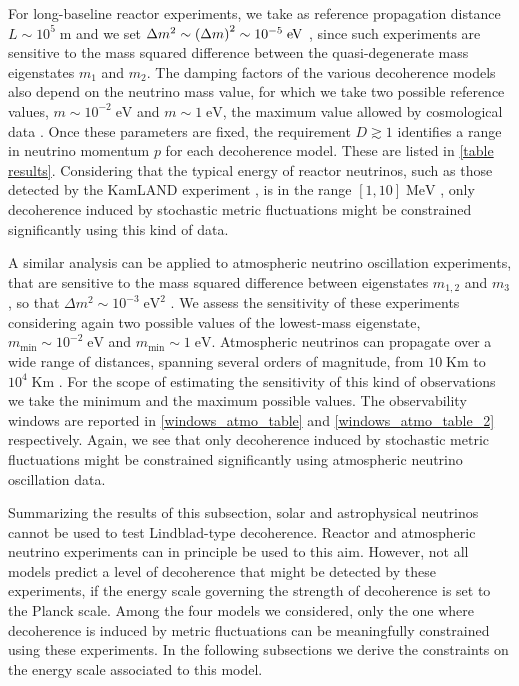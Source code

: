 \documentclass[11pt]{article}
\begin{document}
For long-baseline reactor experiments, we take as reference  propagation distance $L\sim 10^5\;\text{m}$ 
and we set $\Delta m^2 \sim \qty(\Delta m)^2 \sim 10^{-5} \;\text{eV}$ \cite{KamLAND:2008dgz}, since such experiments are sensitive to the mass squared difference between the quasi-degenerate mass eigenstates $m_1$ and $m_2$. The damping factors of the various decoherence models also depend on the neutrino mass value, for which we take two possible reference values, $m\sim 10^{-2}\;\text{eV}$ and $m \sim 1\;\text{eV}$, the maximum  value allowed by cosmological data \cite{DiValentino:2021imh}. Once these   parameters  are fixed, the requirement $D\gtrsim 1$ identifies a range in neutrino momentum $p$ for each decoherence model. These are listed in \cref{table results}. Considering that the typical energy of reactor neutrinos, such as those detected by the KamLAND experiment \cite{KamLAND:2008dgz}, is in the range $[1,10]\; \text{MeV}$ \cite{KamLAND:2008dgz},  only decoherence induced by stochastic metric fluctuations  \cite{Breuer:2008rh}  might be constrained significantly using this kind of data. 



A similar analysis can be applied to atmospheric neutrino oscillation experiments, that are sensitive to the mass squared difference between eigenstates $m_{1,2}$ and $m_3$, so that $\Delta m^2 \sim 10^{-3}\;\text{eV}^2$ \cite{Super-Kamiokande:2004orf}. We assess the sensitivity of these experiments considering again two possible values of the lowest-mass eigenstate,  $m_{\text{min}} \sim 10^{-2}\;\text{eV}$ and $m_{\text{min}}\sim 1\;\text{eV}$. Atmospheric neutrinos can propagate over a wide range of distances, spanning several orders of magnitude, from $10\;\text{Km}$ to $10^4\;\text{Km}$ \cite{Super-Kamiokande:2004orf}. For the scope of estimating the sensitivity of this kind of observations we take the  minimum and the maximum possible values. The observability windows are reported in \cref{windows_atmo_table} and \cref{windows_atmo_table_2} respectively. Again, we see that  only decoherence induced by stochastic metric fluctuations \cite{Breuer:2008rh}  might be constrained significantly using atmospheric neutrino oscillation data. 

Summarizing the results of this subsection, solar and astrophysical neutrinos cannot be used to test Lindblad-type decoherence. Reactor and atmospheric neutrino experiments can in principle be used to this aim. However, not all  models predict a  level of decoherence that might be detected by these experiments, if the energy scale governing the strength of decoherence is set to the Planck scale. Among the four models we considered, only the one where decoherence is induced by metric fluctuations  can be meaningfully constrained using these experiments. In the following subsections we derive the constraints on the energy scale associated to this model.
\end{document}
